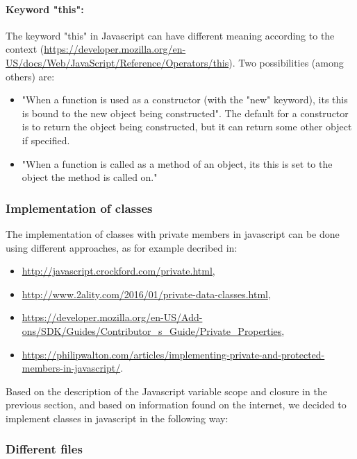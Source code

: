  \paragraph{Keyword "this":}
The keyword "this" in Javascript can have different meaning according to the
context
(\url{https://developer.mozilla.org/en-US/docs/Web/JavaScript/Reference/Operators/this}).
Two possibilities (among others) are:
\begin{itemize}
  \item "When a function is used as a constructor (with the "new" keyword), its this is bound 
to the new object being constructed". The default for a constructor is to return
the object being constructed, but it can return some other object if specified.
  \item "When a function is called as a method of an object, its this is set to 
        the object the method is called on."
\end{itemize}


\subsubsection{Implementation of classes}

The implementation of classes with private members in javascript can be
done using different approaches, as for example decribed in:
\begin{itemize}
 \item \url{http://javascript.crockford.com/private.html}, 
 \item \url{http://www.2ality.com/2016/01/private-data-classes.html},
 \item \url{https://developer.mozilla.org/en-US/Add-ons/SDK/Guides/Contributor_s_Guide/Private_Properties},
 \item \url{https://philipwalton.com/articles/implementing-private-and-protected-members-in-javascript/}.
\end{itemize}

Based on the description of the Javascript variable scope and closure in the previous section,
and based on information found on the internet, we decided to implement classes in
javascript in the following way:




\subsubsection{Different files}

